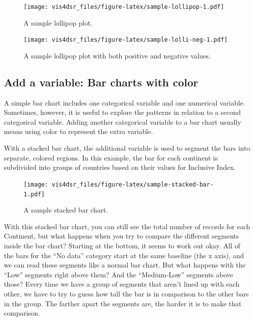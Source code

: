 \documentclass[
]{krantz}
\begin{document}
\begin{figure}
\centering
\texttt{[image: vis4dsr\_files/figure-latex/sample-lollipop-1.pdf]}
\caption{\label{fig:sample-lollipop}A sample lollipop plot.}
\end{figure}

\begin{figure}
\centering
\texttt{[image: vis4dsr\_files/figure-latex/sample-lolli-neg-1.pdf]}
\caption{\label{fig:sample-lolli-neg}A sample lollipop plot with both positive and negative values.}
\end{figure}

\hypertarget{add-a-variable-bar-charts-with-color}{%
\subsection{Add a variable: Bar charts with color}\label{add-a-variable-bar-charts-with-color}}

A simple bar chart includes one categorical variable and one numerical variable.
Sometimes, however, it is useful to explore the patterns in relation to a second
categorical variable. Adding another categorical variable to a bar chart usually
means using color to represent the extra variable.

With a stacked bar chart, the additional variable is used to segment the bars into
separate, colored regions. In this example, the bar for each continent is subdivided
into groups of countries based on their values for Inclusive Index.

\begin{figure}
\centering
\texttt{[image: vis4dsr\_files/figure-latex/sample-stacked-bar-1.pdf]}
\caption{\label{fig:sample-stacked-bar}A sample stacked bar chart.}
\end{figure}

With this stacked bar chart, you can still see the total number of records for each Continent,
but what happens when you try to compare the different segments inside the
bar chart? Starting at the bottom, it seems to work out okay. All of the bars
for the ``No data'' category start at the same baseline (the x axis), and we can
read these segments like a normal bar chart. But what happens with the ``Low'' segments
right above them? And the ``Medium-Low'' segments above those? Every time we have
a group of segments that aren't lined up with each other, we have to try to guess
how tall the bar is in comparison to the other bars in the group. The farther
apart the segments are, the harder it is to make that comparison.
\end{document}
